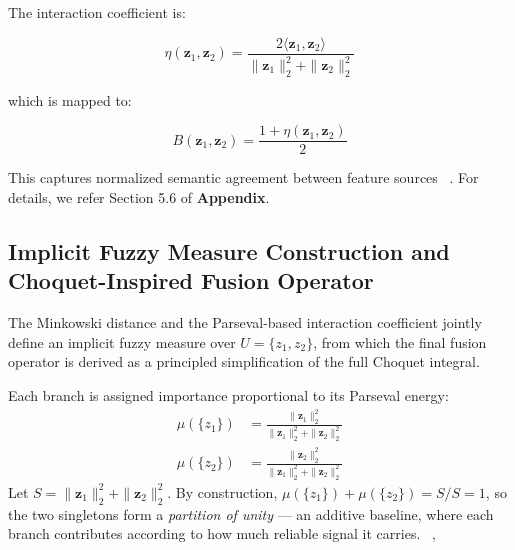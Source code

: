 \documentclass[preprint,12pt]{elsarticle}
\begin{document}
The interaction coefficient is:

\begin{equation*}
\eta(\mathbf{z}_1, \mathbf{z}_2)
=
\frac{2\langle \mathbf{z}_1, \mathbf{z}_2 \rangle}
{\|\mathbf{z}_1\|_2^2 + \|\mathbf{z}_2\|_2^2}
\end{equation*}

which is mapped to:

\begin{equation*}
B(\mathbf{z}_1, \mathbf{z}_2)
=
\frac{1 + \eta(\mathbf{z}_1, \mathbf{z}_2)}{2}
\end{equation*}

This captures normalized semantic agreement between feature sources ~\cite{b9,b10}. For details, we refer Section 5.6 of \textbf{Appendix}.

\subsection{Implicit Fuzzy Measure Construction and Choquet-Inspired Fusion Operator}

The Minkowski distance and the Parseval-based interaction coefficient jointly define an implicit fuzzy measure over $U = \{z_1, z_2\}$, from which the final fusion operator is derived as a principled simplification of the full Choquet integral.

Each branch is assigned importance proportional to its Parseval energy:
\begin{align*}
    \mu(\{z_1\}) &= \frac{\|\mathbf{z}_1\|_2^2}{\|\mathbf{z}_1\|_2^2 + \|\mathbf{z}_2\|_2^2} \\[6pt]
    \mu(\{z_2\}) &= \frac{\|\mathbf{z}_2\|_2^2}{\|\mathbf{z}_1\|_2^2 + \|\mathbf{z}_2\|_2^2}
\end{align*}
Let $S = \|\mathbf{z}_1\|_2^2 + \|\mathbf{z}_2\|_2^2$. By construction, $\mu(\{z_1\}) + \mu(\{z_2\}) = S/S = 1$, so the two singletons form a \emph{partition of unity} — an additive baseline, where each branch contributes according to how much reliable signal it carries. ~\cite{b15},~\cite{b14}
\end{document}
